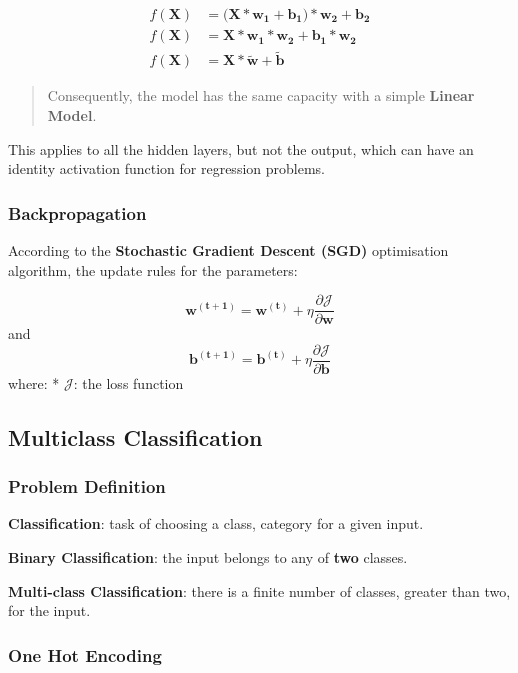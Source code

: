 \documentclass[11pt]{article}
\begin{document}
\begin{align}
    f(\mathbf{X}) &= (\mathbf{X}*\mathbf{w_{1}} + \mathbf{b_{1})*\mathbf{w_{2}} + \mathbf{b_{2}}}\\
    f(\mathbf{X}) &= \mathbf{X}*\mathbf{w_{1}}*\mathbf{w_{2}} + \mathbf{b_{1}}*\mathbf{w_{2}}\\
    f(\mathbf{X}) &= \mathbf{X}*\mathbf{\tilde{w}} + \mathbf{\tilde{b}}
\end{align}

\begin{quote}
Consequently, the model has the same capacity with a simple
\textbf{Linear Model}.
\end{quote}

This applies to all the hidden layers, but not the output, which can
have an identity activation function for regression problems.

    \subsubsection{Backpropagation }\label{backpropagation}

    According to the \textbf{Stochastic Gradient Descent (SGD)} optimisation
algorithm, the update rules for the parameters:

\[\mathbf{w^{(t+1)}} = \mathbf{w^{(t)}} + \eta \frac{\partial \mathcal{J}}{\partial \mathbf{w}}\]
and
\[\mathbf{b^{(t+1)}} = \mathbf{b^{(t)}} + \eta \frac{\partial \mathcal{J}}{\partial \mathbf{b}}\]
where: * \(\mathcal{J}\): the loss function

    \subsection{Multiclass Classification }\label{multiclass-classification}

    \subsubsection{Problem Definition }\label{problem-definition}

    \textbf{Classification}: task of choosing a class, category for a given
input.

\textbf{Binary Classification}: the input belongs to any of \textbf{two}
classes.

\textbf{Multi-class Classification}: there is a finite number of
classes, greater than two, for the input.

    \subsubsection{One Hot Encoding }\label{one-hot-encoding}
\end{document}
